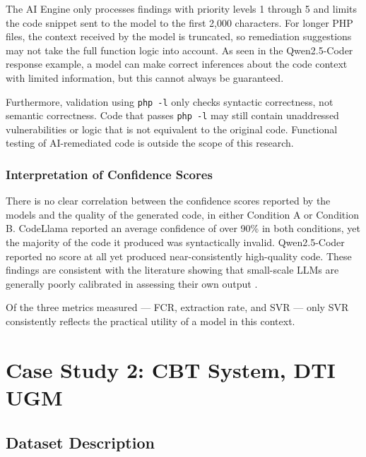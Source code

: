The AI Engine only processes findings with priority levels 1 through 5 and limits the code snippet sent to the model to the first 2,000 characters. For longer PHP files, the context received by the model is truncated, so remediation suggestions may not take the full function logic into account. As seen in the Qwen2.5-Coder response example, a model can make correct inferences about the code context with limited information, but this cannot always be guaranteed.

Furthermore, validation using \texttt{php -l} only checks syntactic correctness, not semantic correctness. Code that passes \texttt{php -l} may still contain unaddressed vulnerabilities or logic that is not equivalent to the original code. Functional testing of AI-remediated code is outside the scope of this research.

\subsubsection{Interpretation of Confidence Scores}

There is no clear correlation between the confidence scores reported by the models and the quality of the generated code, in either Condition A or Condition B. CodeLlama reported an average confidence of over 90\% in both conditions, yet the majority of the code it produced was syntactically invalid. Qwen2.5-Coder reported no score at all yet produced near-consistently high-quality code. These findings are consistent with the literature showing that small-scale LLMs are generally poorly calibrated in assessing their own output \cite{akuthota2023vulnerability}\cite{li2025iris}.

Of the three metrics measured — FCR, extraction rate, and SVR — only SVR consistently reflects the practical utility of a model in this context.

\section{Case Study 2: CBT System, DTI UGM}

\subsection{Dataset Description}

